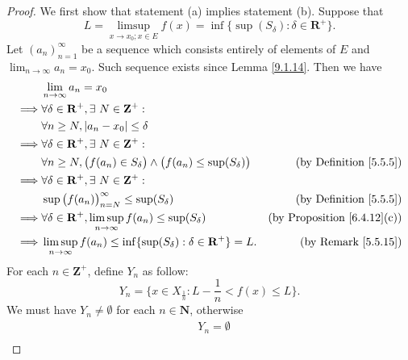 \begin{proof}
    We first show that statement (a) implies statement (b).
    Suppose that
    \[
        L = \limsup_{x \to x_0 ; x \in E} f(x) = \inf\{\sup(S_\delta) : \delta \in \mathbf{R}^+\}.
    \]
    Let \((a_n)_{n = 1}^\infty\) be a sequence which consists entirely of elements of \(E\) and \(\lim_{n \to \infty} a_n = x_0\).
    Such sequence exists since Lemma \ref{9.1.14}.
    Then we have
    \begin{align*}
                 & \lim_{n \to \infty} a_n = x_0                                                                                                            \\
        \implies & \forall \delta \in \mathbf{R}^+, \exists\ N \in \mathbf{Z}^+ :                                                                           \\
                 & \forall n \geq N, \abs*{a_n - x_0} \leq \delta                                                                                           \\
        \implies & \forall \delta \in \mathbf{R}^+, \exists\ N \in \mathbf{Z}^+ :                                                                           \\
                 & \forall n \geq N, \big(f(a_n) \in S_{\delta}\big) \land \big(f(a_n) \leq \sup(S_{\delta})\big) & \text{(by Definition \ref{5.5.5})}      \\
        \implies & \forall \delta \in \mathbf{R}^+, \exists\ N \in \mathbf{Z}^+ :                                                                           \\
                 & \sup\big(f(a_n)\big)_{n = N}^\infty \leq \sup(S_{\delta})                                      & \text{(by Definition \ref{5.5.5})}      \\
        \implies & \forall \delta \in \mathbf{R}^+, \limsup_{n \to \infty} f(a_n) \leq \sup(S_{\delta})           & \text{(by Proposition \ref{6.4.12}(c))} \\
        \implies & \limsup_{n \to \infty} f(a_n) \leq \inf\{\sup(S_{\delta}) : \delta \in \mathbf{R}^+\} = L.     & \text{(by Remark \ref{5.5.15})}
    \end{align*}
    For each \(n \in \mathbf{Z}^+\), define \(Y_n\) as follow:
    \[
        Y_n = \{x \in X_{\frac{1}{n}} : L - \frac{1}{n} < f(x) \leq L\}.
    \]
    We must have \(Y_n \neq \emptyset\) for each \(n \in \mathbf{N}\), otherwise
    \begin{align*}
                 & Y_n = \emptyset                                                                                         \\

\end{align*}
\end{proof}
